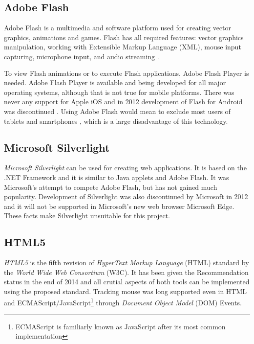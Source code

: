 \subsection{Adobe Flash}
Adobe Flash is a multimedia and software platform used for creating vector graphics, animations and games. Flash has all required features: vector graphics manipulation, working with Extensible Markup Language (XML), mouse input capturing, microphone input, and audio streaming \cite{flash}. 

To view Flash animations or to execute Flash applications, Adobe Flash Player is needed. Adobe Flash Player is available and being developed for all major operating systems, although that is not true for mobile platforms. There was never any support for Apple iOS \cite{steve_jobs} and in 2012 development of Flash for Android was discontinued \cite{adobe_mobile}. Using Adobe Flash would mean to exclude most users of tablets and smartphones \cite{mobile_statistics}, which is a large disadvantage of this technology.

\subsection{Microsoft Silverlight}
\textit{Microsoft Silverlight} \cite{silverlight} can be used for creating web applications. It is based on the .NET Framework and it is similar to Java applets and Adobe Flash. It was Microsoft's attempt to compete Adobe Flash, but has not gained much popularity. Development of Silverlight was also discontinued by Microsoft in 2012 and it will not be supported in Microsoft's new web browser Microsoft Edge\cite{silverlight_is_dead}. These facts make Silverlight unsuitable for this project.


\subsection{HTML5}
\textit{HTML5} is the fifth revision of \textit{HyperText Markup Language} (HTML) standard by the \textit{World Wide Web Consortium} (W3C). It has been given the Recommendation status in the end of 2014 and all crutial aspects of both tools can be implemented using the proposed standard. Tracking mouse was long supported even in HTML and ECMAScript/JavaScript\footnote{ECMAScript is familiarly known as JavaScript after its most common implementation\cite{javascript_vs_ecmascript}} through \textit{Document Object Model} (DOM) Events\cite{dom_mouse_events}.

